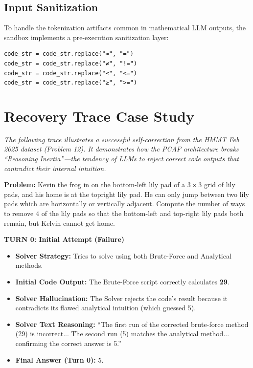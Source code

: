 \documentclass{article}
\begin{document}
\subsection{Input Sanitization}
To handle the tokenization artifacts common in mathematical LLM outputs, the sandbox implements a pre-execution sanitization layer:

\begin{verbatim}
code_str = code_str.replace("≈", "=")
code_str = code_str.replace("≠", "!=")
code_str = code_str.replace("≤", "<=")
code_str = code_str.replace("≥", ">=")
\end{verbatim}

\section{Recovery Trace Case Study}
\label{app:trace}

\textit{The following trace illustrates a successful self-correction from the HMMT Feb 2025 dataset (Problem 12). It demonstrates how the PCAF architecture breaks ``Reasoning Inertia''—the tendency of LLMs to reject correct code outputs that contradict their internal intuition.}

\noindent\hrulefill

\textbf{Problem:} Kevin the frog in on the bottom-left lily pad of a $3 \times 3$ grid of lily pads, and his home is at the topright lily pad. He can only jump between two lily pads which are horizontally or vertically adjacent. Compute the number of ways to remove $4$ of the lily pads so that the bottom-left and top-right lily pads both remain, but Kelvin cannot get home.


\vspace{0.5em}
\textbf{TURN 0: Initial Attempt (Failure)}
\begin{itemize}
    \item \textbf{Solver Strategy:} Tries to solve using both Brute-Force and Analytical methods.
    \item \textbf{Initial Code Output:} The Brute-Force script correctly calculates \textbf{29}.
    \item \textbf{Solver Hallucination:} The Solver rejects the code's result because it contradicts its flawed analytical intuition (which guessed 5).
    \item \textbf{Solver Text Reasoning:} ``The first run of the corrected brute-force method (29) is incorrect... The second run (5) matches the analytical method... confirming the correct answer is 5.''
    \item \textbf{Final Answer (Turn 0):} 5.
\end{itemize}
\end{document}
